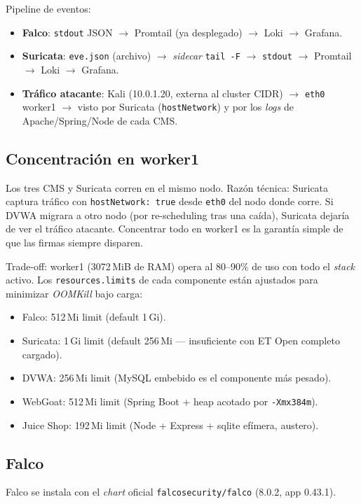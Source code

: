 Pipeline de eventos:
\begin{itemize}
  \item \textbf{Falco}: \texttt{stdout} JSON $\to$ Promtail (ya desplegado) $\to$ Loki $\to$ Grafana.
  \item \textbf{Suricata}: \texttt{eve.json} (archivo) $\to$ \emph{sidecar} \texttt{tail -F} $\to$ \texttt{stdout} $\to$ Promtail $\to$ Loki $\to$ Grafana.
  \item \textbf{Tráfico atacante}: Kali (10.0.1.20, externa al cluster CIDR) $\to$ \texttt{eth0} worker1 $\to$ visto por Suricata (\texttt{hostNetwork}) y por los \emph{logs} de Apache/Spring/Node de cada CMS.
\end{itemize}

\subsection{Concentración en worker1}

Los tres CMS y Suricata corren en el mismo nodo. Razón técnica: Suricata captura tráfico con \texttt{hostNetwork: true} desde \texttt{eth0} del nodo donde corre. Si DVWA migrara a otro nodo (por re-scheduling tras una caída), Suricata dejaría de ver el tráfico atacante. Concentrar todo en worker1 es la garantía simple de que las firmas siempre disparen.

Trade-off: worker1 (3072\,MiB de RAM) opera al 80--90\% de uso con todo el \emph{stack} activo. Los \texttt{resources.limits} de cada componente están ajustados para minimizar \emph{OOMKill} bajo carga:

\begin{itemize}
  \item Falco: 512\,Mi limit (default 1\,Gi).
  \item Suricata: 1\,Gi limit (default 256\,Mi --- insuficiente con ET Open completo cargado).
  \item DVWA: 256\,Mi limit (MySQL embebido es el componente más pesado).
  \item WebGoat: 512\,Mi limit (Spring Boot + heap acotado por \texttt{-Xmx384m}).
  \item Juice Shop: 192\,Mi limit (Node + Express + sqlite efímera, austero).
\end{itemize}

\subsection{Falco}

Falco se instala con el \emph{chart} oficial \texttt{falcosecurity/falco} (8.0.2, app 0.43.1).

